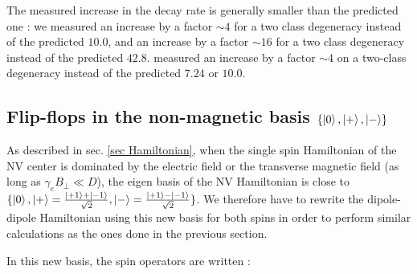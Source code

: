 \documentclass[preprintnumbers,amsmath,amssymb,onecolumn,12pt]{revtex4-2}
\begin{document}
The measured increase in the decay rate is generally smaller than the predicted one : we measured an increase by a factor $\sim 4$ for a two class degeneracy instead of the predicted $10.0$, and an increase by a factor $\sim 16$ for a two class degeneracy instead of the predicted $42.8$. \cite{choi_depolarization_2017} measured an increase by a factor $\sim 4$ on a two-class degeneracy instead of the predicted $7.24$ or $10.0$.

\subsection{Flip-flops in the non-magnetic basis $\{ \ket{0},\ket{+},\ket{-} \} $}

As described in sec. \ref{sec Hamiltonian}, when the single spin Hamiltonian of the NV center is dominated by the electric field or the transverse magnetic field (as long as $\gamma_e B_\perp \ll D$), the eigen basis of the NV Hamiltonian is close to $\{\ket{0},\ket{+}=\frac{\ket{+1}+\ket{-1}}{\sqrt{2}},\ket{-}=\frac{\ket{+1}-\ket{-1}}{\sqrt{2}} \} $. We therefore have to rewrite the dipole-dipole Hamiltonian using this new basis for both spins in order to perform similar calculations as the ones done in the previous section.

In this new basis, the spin operators are written :


{}
\end{document}
